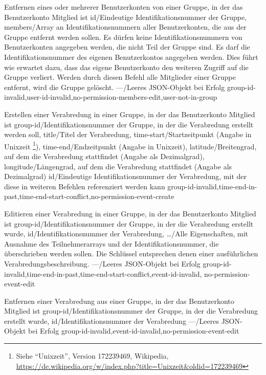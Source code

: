 \documentclass[parskip=full,11pt]{scrartcl}
\begin{document}
{Entfernen eines oder mehrerer Benutzerkonten von einer Gruppe, in der das
Benutzerkonto Mitglied ist}
{id/Eindeutige Identifikationsnummer der Gruppe,
members/Array an Identifikationsnummern aller Benutzerkonten{,} die aus der
Gruppe entfernt werden sollen.
Es dürfen keine Identifikationsnummern von Benutzerkonten angegeben werden{,}
die nicht Teil der Gruppe sind.
Es darf die Identifikationsnummer des eigenen Benutzerkontos angegeben werden.
Dies führt wie erwartet dazu{,} dass das eigene Benutzerkonto den weiteren
Zugriff auf die Gruppe verliert.
Werden durch diesen Befehl alle Mitglieder einer Gruppe entfernt{,} wird die
Gruppe gelöscht.}
{---/Leeres JSON-Objekt bei Erfolg}
{group-id-invalid,user-id-invalid,no-permission-members-edit,user-not-in-group}

{Erstellen einer Verabredung in einer Gruppe, in der das Benutzerkonto Mitglied
ist}
{group-id/Identifikationsnummer der Gruppe{,} in der die Verabredung erstellt
werden soll,
title/Titel der Verabredung,
time-start/Startzeitpunkt (Angabe in Unixzeit%
\footnote{Siehe \enquote{Unixzeit}, Version 172239469, Wikipedia,\\
\url{https://de.wikipedia.org/w/index.php?title=Unixzeit&oldid=172239469}}),
time-end/Endzeitpunkt (Angabe in Unixzeit),
latitude/Breitengrad{,} auf dem die Verabredung stattfindet (Angabe als
Dezimalgrad),
longitude/Längengrad{,} auf dem die Verabredung stattfindet (Angabe als
Dezimalgrad)}
{id/Eindeutige Identifikationsnummer der Verabredung{,} mit der diese in weiteren
Befehlen referenziert werden kann}
{group-id-invalid,time-end-in-past,time-end-start-conflict,no-permission-event-create}

{Editieren einer Verabredung in einer Gruppe, in der das Benutzerkonto Mitglied
ist}
{group-id/Identifikationsnummer der Gruppe{,} in der die Verabredung erstellt
wurde,
id/Identifikationsnummer der Verabredung,
\dots/Alle Eigenschaften{,} mit Ausnahme des Teilnehmerarrays und der
Identifikationsnummer{,} die überschrieben werden sollen.
Die Schlüssel entsprechen denen einer ausführlichen Verabredungsbeschreibung.}
{---/Leeres JSON-Objekt bei Erfolg}
{group-id-invalid,time-end-in-past,time-end-start-conflict,event-id-invalid,%
no-permission-event-edit}

{Entfernen einer Verabredung aus einer Gruppe, in der das Benutzerkonto
Mitglied ist}
{group-id/Identifikationsnummer der Gruppe{,} in der die Verabredung erstellt
wurde,
id/Identifikationsnummer der Verabredung}
{---/Leeres JSON-Objekt bei Erfolg}
{group-id-invalid,event-id-invalid,no-permission-event-edit}
\end{document}
